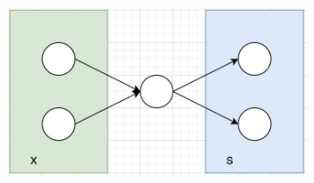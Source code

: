 \documentclass{article}
\begin{document}
\begin{center}
    \includegraphics[width=9cm, height=5cm]{images/problem-4-example.jpg}
\end{center}

\newpage
 

\end{document}

